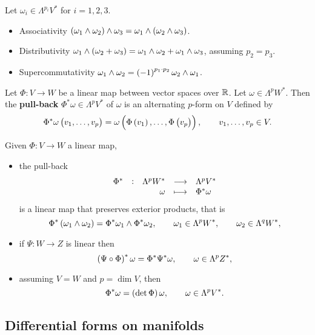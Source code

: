 \begin{proposition}
\label{prop:1.6}
Let $ \omega_i \in \Lambda^{p_i}V^* $ for $ i = 1, 2, 3 $.
\begin{itemize}
\item Associativity $ \br{\omega_1 \wedge \omega_2} \wedge \omega_3 = \omega_1 \wedge \br{\omega_2 \wedge \omega_3} $.
\item Distributivity $ \omega_1 \wedge \br{\omega_2 + \omega_3} = \omega_1 \wedge \omega_2 + \omega_1 \wedge \omega_3 $, assuming $ p_2 = p_3 $.
\item Supercommutativity $ \omega_1 \wedge \omega_2 = \br{-1}^{p_1 \cdot p_2}\omega_2 \wedge \omega_1 $.
\end{itemize}
\end{proposition}

\begin{definition}
Let $ \Phi : V \to W $ be a linear map between vector spaces over $ \mathbb{R} $. Let $ \omega \in \Lambda^pW^* $. Then the \textbf{pull-back} $ \Phi^*\omega \in \Lambda^pV^* $ of $ \omega $ is an alternating $ p $-form on $ V $ defined by
$$ \Phi^*\omega\br{v_1, \dots, v_p} = \omega\br{\Phi\br{v_1}, \dots, \Phi\br{v_p}}, \qquad v_1, \dots, v_p \in V. $$
\end{definition}

\pagebreak

\begin{proposition}
\label{prop:1.8}
Given $ \Phi : V \to W $ a linear map,
\begin{itemize}
\item the pull-back
$$ \function[\Phi^*]{\Lambda^pW^*}{\Lambda^pV^*}{\omega}{\Phi^*\omega} $$
is a linear map that preserves exterior products, that is
$$ \Phi^*\br{\omega_1 \wedge \omega_2} = \Phi^*\omega_1 \wedge \Phi^*\omega_2, \qquad \omega_1 \in \Lambda^pW^*, \qquad \omega_2 \in \Lambda^qW^*, $$
\item if $ \Psi : W \to Z $ is linear then
$$ \br{\Psi \circ \Phi}^*\omega = \Phi^*\Psi^*\omega, \qquad \omega \in \Lambda^pZ^*, $$
\item assuming $ V = W $ and $ p = \dim V $, then
$$ \Phi^*\omega = \br{\det \Phi}\omega, \qquad \omega \in \Lambda^pV^*. $$
\end{itemize}
\end{proposition}

\subsection{Differential forms on manifolds}

